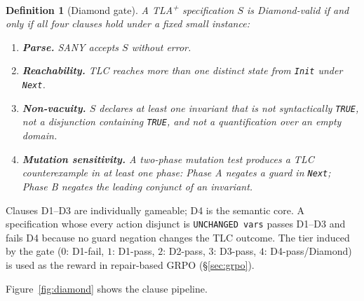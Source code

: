 \documentclass[10pt,twocolumn]{article}
\newtheorem{definition}{Definition}
\begin{document}
\begin{definition}[Diamond gate]
\label{def:diamond}
A TLA\textsuperscript{+} specification $S$ is \emph{Diamond-valid} if and
only if all four clauses hold under a fixed small instance:
\begin{enumerate}[label=\textbf{D\arabic*.},leftmargin=2em,topsep=2pt,itemsep=1pt]
\item \textbf{Parse.} SANY accepts $S$ without error.
\item \textbf{Reachability.} TLC reaches more than one distinct state from
  \texttt{Init} under \texttt{Next}.
\item \textbf{Non-vacuity.} $S$ declares at least one invariant that is not
  syntactically \texttt{TRUE}, not a disjunction containing \texttt{TRUE},
  and not a quantification over an empty domain.
\item \textbf{Mutation sensitivity.} A two-phase mutation test produces a TLC
  counterexample in at least one phase: Phase A negates a guard in
  \texttt{Next}; Phase B negates the leading conjunct of an invariant.
\end{enumerate}
\end{definition}

Clauses D1--D3 are individually gameable; D4 is the semantic core.
A specification whose every action disjunct is \texttt{UNCHANGED vars} passes
D1--D3 and fails D4 because no guard negation changes the TLC outcome.
The tier induced by the gate ($0$: D1-fail, $1$: D1-pass, $2$: D2-pass, $3$:
D3-pass, $4$: D4-pass/Diamond) is used as the reward in
repair-based GRPO (\S\ref{sec:grpo}).

Figure~\ref{fig:diamond} shows the clause pipeline.
\end{document}
